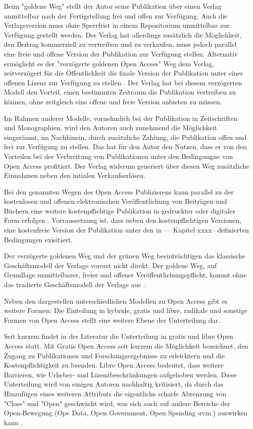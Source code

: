 Beim "goldene Weg" stellt der Autor seine Publikation über einen Verlag unmittelbar nach der Fertigstellung frei und offen zur Verfügung. Auch die Verlagsversion muss ohne Sperrfrist in einem Repositorium unmittelbar zur Verfügung gestellt werden. Der Verlag hat allerdings zusätzlich die Möglichkeit, den Beitrag kommerziell zu vertreiben und zu verkaufen, muss jedoch parallel eine freie und offene Version der Publikation zur Verfügung stellen. Alternativ ermöglicht es der "verzögerte goldenen Open Access" Weg dem Verlag, zeitverzögert für die Öffentlichkeit die finale Version der Publikation unter einer offenen Lizenz zur Verfügung zu stellen \cite{lewis_2012_inevitability}. Der Verlag hat bei diesem verzögerten Modell den Vorteil, einen bestimmten Zeitraum die Publikation vertreiben zu können, ohne zeitgleich eine offene und freie Version anbieten zu müssen.

Im Rahmen anderer Modelle, vornehmlich bei der Publikation in Zeitschriften und Monographien, wird den Autoren auch zunehmend die Möglichkeit eingeräumt, im Nachhinein, durch zusätzliche Zahlung, die Publikation offen und frei zur Verfügung zu stellen\cite{lewis_2012_inevitability}. Das hat für den Autor den Nutzen, dass er von den Vorteilen bei der Verbreitung von Publikationen unter den Bedingungne von Open Access profitiert. Der Verlag widerum generiert über diesen Weg zusätzliche Einnahmen neben den intialen Verkaufserlösen.

Bei den genannten Wegen des Open Access Publizierens kann parallel zu der kostenlosen und offenen elektronischen Veröffentlichung von Beiträgen und Büchern eine weitere kostenpflichtige Publikation in gedruckter oder digitaler Form erfolgen \cite{suchen}. Vorraussetzung ist, dass neben den kostenpflichtigen Versionen, eine kostenfreie Version der Publikation unter den in --- Kapitel xxxx-- definierten Bedingungen exisitiert.

Der verzögerte goldenen Weg und der grünen Weg beeinträchtigen das klassische Geschäftsmodell der Verlage vorerst nicht direkt. Der goldene Weg, auf Grundlage unmittelbarer, freier und offener Veröffentlichungspflicht, kommt ohne das tradierte Geschäftsmodell der Verlage aus \cite{lewis_2012_inevitability}.

Neben den dargestellen unterschiedlichen Modellen zu Open Access gibt es weitere Formen: Die Einteilung in hybride, gratis und libre, radikale und sonstige Formen von Open Access stellt eine weitere Ebene der Unterteilung dar. 

Seit kurzem findet in der Literatur die Unterteilung in gratis und libre Open Access statt. Mit Gratis Open Access seit kurzem die Möglichkeit bezeichnet, den Zugang zu Publikationen und Forschungsergebnisse zu erleichtern und die Kostenpflichtigkeit zu beenden. Libre Open Access bedeutet, dass weitere Barrieren, wie Urheber- und Lizenzbeschränkungen aufgehoben werden. \cite{Adema_2014_open_access} Diese Unterteilung wird von einigen Autoren nachhaltig kritisiert, da durch das Hinzufügen eines weiteren Attributs die eigentliche scharfe Abrenzung von "Close" und "Open" geschwächt wird, was sich auch auf andere Bereiche der Open-Bewegung (Ope Data, Open Government, Open Spending uvm.) auswirken kann \cite{suchen}. 

